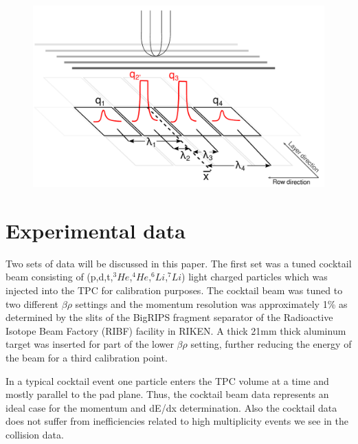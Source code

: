 \documentclass[review]{elsarticle}
\begin{document}
\begin{figure}[ht]
\label{fig:satpad}
\includegraphics[width=\linewidth]{saturated_pads}
\end{figure}

\section{Experimental data}

Two sets of data will be discussed in this paper. The first set was a tuned cocktail beam consisting of (p,d,t,${}^3He$,${}^4He$,${}^6Li$,${}^7Li$) light charged particles which was injected into the TPC for calibration purposes. The cocktail beam was tuned to two different $\beta\rho$ settings and the momentum resolution was approximately 1\% as determined by the slits of the BigRIPS fragment separator of the Radioactive Isotope Beam Factory (RIBF) facility in RIKEN. A thick 21mm thick aluminum target was inserted for part of the lower $\beta\rho$ setting, further reducing the energy of the beam for a third calibration point. 

In a typical cocktail event one particle enters the TPC volume at a time and mostly parallel to the pad plane. Thus, the cocktail beam data represents an ideal case for the momentum and dE/dx determination. Also the cocktail data does not suffer from inefficiencies related to high multiplicity events we see in the collision data. 
\end{document}
